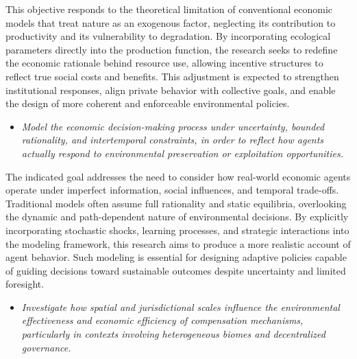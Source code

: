 This objective responds to the theoretical limitation of conventional economic models that treat nature as an exogenous factor, neglecting its contribution to productivity and its vulnerability to degradation. By incorporating ecological parameters directly into the production function, the research seeks to redefine the economic rationale behind resource use, allowing incentive structures to reflect true social costs and benefits. This adjustment is expected to strengthen institutional responses, align private behavior with collective goals, and enable the design of more coherent and enforceable environmental policies.

\begin{itemize}

    \item[\textbf{G2.}] 
    
    \textit{Model the economic decision-making process under uncertainty, bounded rationality, and intertemporal constraints, in order to reflect how agents actually respond to environmental preservation or exploitation opportunities.}
    
\end{itemize}

The indicated goal addresses the need to consider how real-world economic agents operate under imperfect information, social influences, and temporal trade-offs. Traditional models often assume full rationality and static equilibria, overlooking the dynamic and path-dependent nature of environmental decisions. By explicitly incorporating stochastic shocks, learning processes, and strategic interactions into the modeling framework, this research aims to produce a more realistic account of agent behavior. Such modeling is essential for designing adaptive policies capable of guiding decisions toward sustainable outcomes despite uncertainty and limited foresight.

\begin{itemize}

    \item[\textbf{G3.}] 
    
    \textit{Investigate how spatial and jurisdictional scales influence the environmental effectiveness and economic efficiency of compensation mechanisms, particularly in contexts involving heterogeneous biomes and decentralized governance.}
    
\end{itemize}

